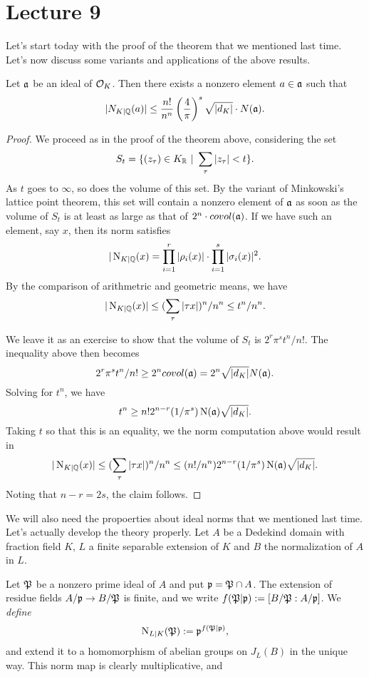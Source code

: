 \section{Lecture 9}

Let's start today with the proof of the theorem that we mentioned last time.
Let's now discuss some variants and applications of the above results.
\begin{theorem}
  Let $\mathfrak{a}$ be an ideal of $\mathcal{O}_{K}$.
  Then there exists a nonzero element $a \in \mathfrak{a}$ such that
  \[ |N_{K|\mathbb{Q}}(a)| \leq \frac{n!}{n^{n}}\left(\frac{4}{\pi}\right)^{s} \sqrt{|d_{K}|} \cdot N(\mathfrak{a}). \]
\end{theorem}
\begin{proof}
  We proceed as in the proof of the theorem above, considering the set
  \[ S_{t} = \{ (z_{\tau}) \in K_{\mathbb{R}} \ | \  \sum_{\tau} | z_{\tau}| < t \}. \]
  As $t$ goes to $\infty$, so does the volume of this set.
  By the variant of Minkowski's lattice point theorem, this set will contain a nonzero element of $\mathfrak{a}$ as soon as the volume of $S_{t}$ is at least as large as that of $2^{n} \cdot covol(\mathfrak{a})$.
  If we have such an element, say $x$, then its norm satisfies
  \[ |\operatorname{N}_{K|\mathbb{Q}}(x) = \prod_{i = 1}^{r}|\rho_{i}(x)| \cdot \prod_{i = 1}^{s}|\sigma_{i}(x)|^{2}. \]
  By the comparison of arithmetric and geometric means, we have
  \[ |\operatorname{N}_{K|\mathbb{Q}}(x)| \leq (\sum_{\tau}|\tau x|)^{n}/n^{n} \leq t^{n}/n^{n}. \]

  We leave it as an exercise to show that the volume of $S_{t}$ is $2^{r}\pi^{s}t^{n}/n!$.
  The inequality above then becomes
  \[ 2^{r}\pi^{s}t^{n}/n! \geq 2^{n} covol(\mathfrak{a}) = 2^{n} \sqrt{|d_{K}|} N(\mathfrak{a}). \]
  Solving for $t^{n}$, we have
  \[ t^{n} \geq n! 2^{n-r} (1/\pi^{s}) \operatorname{N}(\mathfrak{a}) \sqrt{|d_{K}|}. \]
  Taking $t$ so that this is an equality, we the norm computation above would result in
  \[ |\operatorname{N}_{K|\mathbb{Q}}(x)| \leq (\sum_{\tau}|\tau x|)^{n}/n^{n} \leq (n!/n^{n}) 2^{n-r} (1/\pi^{s}) \operatorname{N}(\mathfrak{a}) \sqrt{|d_{K}|}. \]
  Noting that $n - r = 2s$, the claim follows.
\end{proof}

We will also need the propoerties about ideal norms that we mentioned last time.
Let's actually develop the theory properly.
Let $A$ be a Dedekind domain with fraction field $K$, $L$ a finite separable extension of $K$ and $B$ the normalization of $A$ in $L$.

Let $\mathfrak{P}$ be a nonzero prime ideal of $A$ and put $\mathfrak{p} = \mathfrak{P} \cap A$.
The extension of residue fields $A/\mathfrak{p} \to B/\mathfrak{P}$ is finite, and we write $f(\mathfrak{P}|\mathfrak{p}) := [B/\mathfrak{P} : A/\mathfrak{p}]$.
We \emph{define}
\[ \operatorname{N}_{L|K}(\mathfrak{P}) := \mathfrak{p}^{f(\mathfrak{P}|\mathfrak{p})}, \]
and extend it to a homomorphism of abelian groups on $J_{L}(B)$ in the unique way.
This norm map is clearly multiplicative, and 

